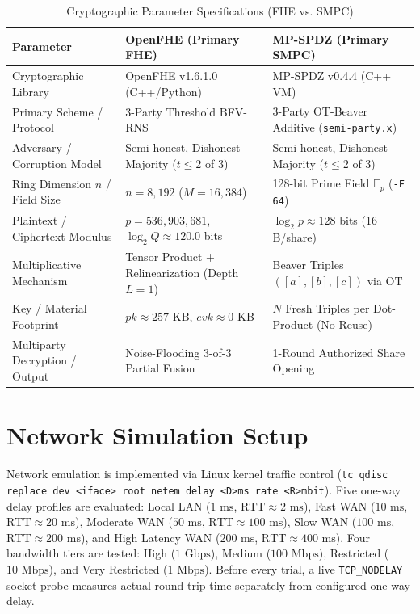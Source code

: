 \documentclass[conference]{IEEEtran}
\begin{document}
\begin{table}[htbp]
\caption{Cryptographic Parameter Specifications (FHE vs. SMPC)}
\label{tab:crypto_params}
\centering
\scriptsize
\begin{tabular}{@{}lll@{}}
\toprule
\textbf{Parameter} & \textbf{OpenFHE (Primary FHE)} & \textbf{MP-SPDZ (Primary SMPC)} \\
\midrule
Cryptographic Library & OpenFHE v1.6.1.0 (C++/Python) & MP-SPDZ v0.4.4 (C++ VM) \\
Primary Scheme / Protocol & 3-Party Threshold BFV-RNS & 3-Party OT-Beaver Additive (\texttt{semi-party.x}) \\
Adversary / Corruption Model & Semi-honest, Dishonest Majority ($t \le 2$ of $3$) & Semi-honest, Dishonest Majority ($t \le 2$ of $3$) \\
Ring Dimension $n$ / Field Size & $n = 8,192$ ($M = 16,384$) & 128-bit Prime Field $\mathbb{F}_p$ (\texttt{-F 64}) \\
Plaintext / Ciphertext Modulus & $p = 536,903,681$, $\log_2 Q \approx 120.0$ bits & $\log_2 p \approx 128$ bits (16 B/share) \\
Multiplicative Mechanism & Tensor Product + Relinearization (Depth $L=1$) & Beaver Triples $([a],[b],[c])$ via OT \\
Key / Material Footprint & $pk \approx 257$ KB, $evk \approx 0$ KB & $N$ Fresh Triples per Dot-Product (No Reuse) \\
Multiparty Decryption / Output & Noise-Flooding 3-of-3 Partial Fusion & 1-Round Authorized Share Opening \\
\bottomrule
\end{tabular}
\end{table}

\section{Network Simulation Setup}
Network emulation is implemented via Linux kernel traffic control (\texttt{tc qdisc replace dev <iface> root netem delay <D>ms rate <R>mbit}). Five one-way delay profiles are evaluated: Local LAN ($1\text{ ms}$, $\text{RTT} \approx 2\text{ ms}$), Fast WAN ($10\text{ ms}$, $\text{RTT} \approx 20\text{ ms}$), Moderate WAN ($50\text{ ms}$, $\text{RTT} \approx 100\text{ ms}$), Slow WAN ($100\text{ ms}$, $\text{RTT} \approx 200\text{ ms}$), and High Latency WAN ($200\text{ ms}$, $\text{RTT} \approx 400\text{ ms}$). Four bandwidth tiers are tested: High ($1\text{ Gbps}$), Medium ($100\text{ Mbps}$), Restricted ($10\text{ Mbps}$), and Very Restricted ($1\text{ Mbps}$). Before every trial, a live \texttt{TCP\_NODELAY} socket probe measures actual round-trip time separately from configured one-way delay.
\end{document}
